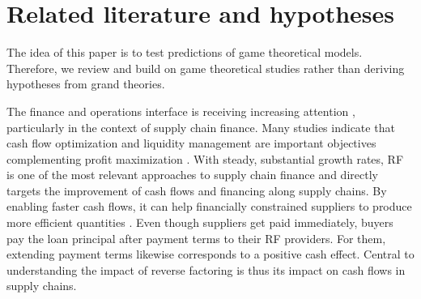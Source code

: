 \documentclass[A4,11pt]{article}
\renewcommand{\~}[1]{\tilde{#1}}
\renewcommand{\-}[1]{\overline{#1}}
\begin{document}
\section{Related literature and hypotheses}\label{sec:literature}
The idea of this paper is to test predictions of game theoretical models. Therefore, we review and build on game theoretical studies rather than deriving hypotheses from grand theories. 

The finance and operations interface is receiving increasing attention \citep{Babich2004,Kouvelis2012,Zhao2015,Serrano2018}, particularly in the context of supply chain finance. Many studies indicate that cash flow optimization and liquidity management are important objectives complementing profit maximization \citep{Boissay2013, Hofmann2010, Filbeck2016}. With steady, substantial growth rates, RF  is one of the most relevant approaches to supply chain finance \citep{Herath2015} and directly targets the improvement of cash flows and financing along supply chains. By enabling faster cash flows, it can help financially constrained suppliers to produce more efficient quantities \citep{Kouvelis2020, Grueter2017}. Even though suppliers get paid immediately, buyers pay the loan principal after payment terms to their RF providers. For them, extending payment terms likewise corresponds to a positive cash effect. Central to understanding the impact of reverse factoring is thus its impact on cash flows in supply chains.
\end{document}
